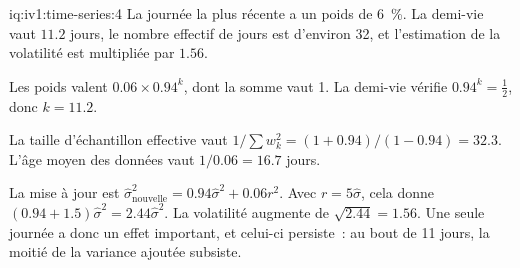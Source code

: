 \begin{solution}{iq:iv1:time-series:4}
La journée la plus récente a un poids de 6~\%. La demi-vie vaut $11.2$ jours, le nombre effectif de jours est d'environ 32, et l'estimation de la volatilité est multipliée par $1.56$.

Les poids valent $0.06 \times 0.94^k$, dont la somme vaut 1. La demi-vie vérifie $0.94^k = \frac12$, donc $k = 11.2$.

La taille d'échantillon effective vaut $1/\sum w_k^2 = (1 + 0.94)/(1 - 0.94) = 32.3$. L'âge moyen des données vaut $1/0.06 = 16.7$ jours.

La mise à jour est $\hat{\sigma}_{\text{nouvelle}}^2 = 0.94\hat{\sigma}^2 + 0.06r^2$. Avec $r = 5\hat{\sigma}$, cela donne $(0.94 + 1.5)\hat{\sigma}^2 = 2.44\hat{\sigma}^2$. La volatilité augmente de $\sqrt{2.44} = 1.56$. Une seule journée a donc un effet important, et celui-ci persiste~: au bout de 11 jours, la moitié de la variance ajoutée subsiste.



\end{solution}

